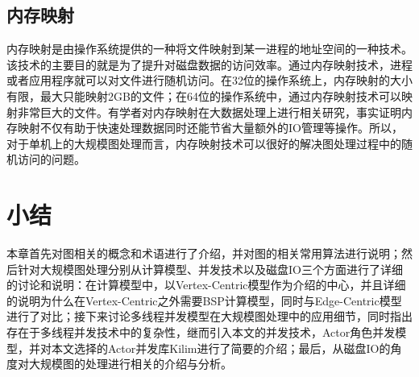\subsection{内存映射}


内存映射是由操作系统提供的一种将文件映射到某一进程的地址空间的一种技术。该技术的主要目的就是为了提升对磁盘数据的访问效率。通过内存映射技术，进程或者应用程序就可以对文件进行随机访问。在32位的操作系统上，内存映射的大小有限，最大只能映射2GB的文件；在64位的操作系统中，通过内存映射技术可以映射非常巨大的文件。有学者\cite{yuhuibin2010neicunyingshe,yangningxue2004neicunyingshe}对内存映射在大数据处理上进行相关研究，事实证明内存映射不仅有助于快速处理数据同时还能节省大量额外的IO管理等操作。所以，对于单机上的大规模图处理而言，内存映射技术可以很好的解决图处理过程中的随机访问的问题。


\section{小结}

本章首先对图相关的概念和术语进行了介绍，并对图的相关常用算法进行说明；然后针对大规模图处理分别从计算模型、并发技术以及磁盘IO三个方面进行了详细的讨论和说明：在计算模型中，以Vertex-Centric模型作为介绍的中心，并且详细的说明为什么在Vertex-Centric之外需要BSP计算模型，同时与Edge-Centric模型进行了对比；接下来讨论多线程并发模型在大规模图处理中的应用细节，同时指出存在于多线程并发技术中的复杂性，继而引入本文的并发技术，Actor角色并发模型，并对本文选择的Actor并发库Kilim进行了简要的介绍；最后，从磁盘IO的角度对大规模图的处理进行相关的介绍与分析。